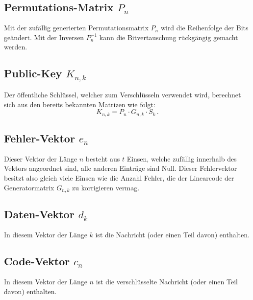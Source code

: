 \subsection{Permutations-Matrix $P_n$
\label{mceliece:subsection:p_n}}
Mit der zufällig generierten Permutationsmatrix $P_n$ wird die Reihenfolge der Bits geändert.
Mit der Inversen $P_n^{-1}$ kann die Bitvertauschung rückgängig gemacht werden.

\subsection{Public-Key $K_{n,k}$
\label{mceliece:subsection:k_nk}}
Der öffentliche Schlüssel, welcher zum Verschlüsseln verwendet wird,
berechnet sich aus den bereits bekannten Matrizen wie folgt:
\[
    K_{n,k}=P_{n}\cdot G_{n,k}\cdot S_{k}\,.
\]

\subsection{Fehler-Vektor $e_n$
\label{mceliece:subsection:e_n}}
Dieser Vektor der Länge $n$ besteht aus $t$ Einsen, welche zufällig innerhalb des Vektors angeordnet sind,
alle anderen Einträge sind Null.
Dieser Fehlervektor besitzt also gleich viele Einsen
wie die Anzahl Fehler, die der Linearcode der Generatormatrix $G_{n,k}$ zu korrigieren vermag.

\subsection{Daten-Vektor $d_k$
\label{mceliece:subsection:d_k}}
In diesem Vektor der Länge $k$ ist die Nachricht (oder einen Teil davon) enthalten.

\subsection{Code-Vektor $c_n$
\label{mceliece:subsection:c_n}}
In diesem Vektor der Länge $n$ ist die verschlüsselte Nachricht (oder einen Teil davon) enthalten.